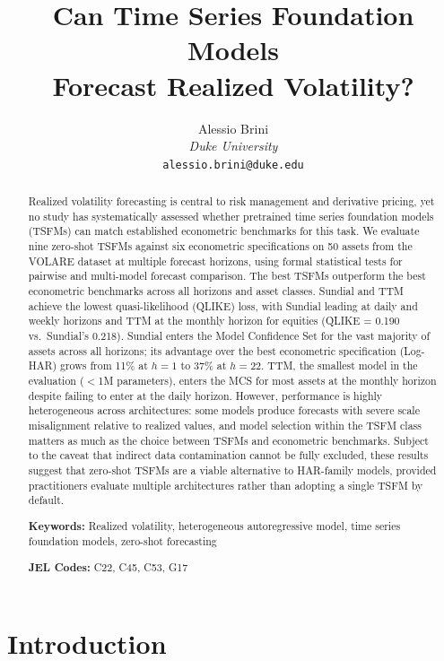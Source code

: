 \documentclass[12pt]{article}
\title{Can Time Series Foundation Models\\Forecast Realized Volatility?}
\author{
  Alessio Brini\\
  \textit{Duke University}\\
  \texttt{alessio.brini@duke.edu}
}
\date{}
\begin{document}
{\renewcommand{\baselinestretch}{1.0}
\maketitle
\thispagestyle{empty}

\begin{abstract}
\noindent
Realized volatility forecasting is central to risk management and derivative pricing, yet no study has systematically assessed whether pretrained time series foundation models (TSFMs) can match established econometric benchmarks for this task.
We evaluate nine zero-shot TSFMs against six econometric specifications on 50 assets from the VOLARE dataset at multiple forecast horizons, using formal statistical tests for pairwise and multi-model forecast comparison.
The best TSFMs outperform the best econometric benchmarks across all horizons and asset classes. Sundial and TTM achieve the lowest quasi-likelihood (QLIKE) loss, with Sundial leading at daily and weekly horizons and TTM at the monthly horizon for equities (QLIKE = 0.190 vs.\ Sundial's 0.218). Sundial enters the Model Confidence Set for the vast majority of assets across all horizons; its advantage over the best econometric specification (Log-HAR) grows from 11\% at $h = 1$ to 37\% at $h = 22$. TTM, the smallest model in the evaluation ($<$1M parameters), enters the MCS for most assets at the monthly horizon despite failing to enter at the daily horizon. However, performance is highly heterogeneous across architectures: some models produce forecasts with severe scale misalignment relative to realized values, and model selection within the TSFM class matters as much as the choice between TSFMs and econometric benchmarks.
Subject to the caveat that indirect data contamination cannot be fully excluded, these results suggest that zero-shot TSFMs are a viable alternative to HAR-family models, provided practitioners evaluate multiple architectures rather than adopting a single TSFM by default.

\medskip
\noindent\textbf{Keywords:} Realized volatility, heterogeneous autoregressive model, time series foundation models, zero-shot forecasting

\noindent\textbf{JEL Codes:} C22, C45, C53, G17
\end{abstract}
}

\newpage
\setcounter{page}{1}

\section{Introduction}
\label{sec:introduction}
\end{document}
